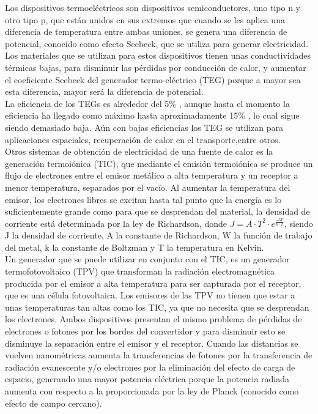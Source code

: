 Los dispositivos termoeléctricos son dispositivos semiconductores, uno tipo n y otro tipo p, que están unidos en sus extremos que cuando se les aplica una diferencia de temperatura entre ambas uniones, se genera una diferencia de potencial, conocido como efecto Seebeck, que se utiliza para generar electricidad. Los materiales que se utilizan para estos dispositivos tienen unas conductividades térmicas bajas, para disminuir las pérdidas por conducción de calor, y aumentar el coeficiente Seebeck del generador termo-eléctrico (TEG) porque a mayor sea esta diferencia, mayor será la diferencia de potencial.\\

La eficiencia de los TEGs es alrededor del 5\% \cite{TEG5efficiency}, aunque hasta el momento la eficiencia ha llegado como máximo hasta aproximadamente 15\% \cite{TEG15efficiency}, lo cual sigue siendo demasiado baja. Aún con bajas eficiencias los TEG se utilizan para aplicaciones espaciales, recuperación de calor en el transporte,entre otros.\\


Otros sistemas de obtención de electricidad de una fuente de calor es la generación termoiónica (TIC), que mediante el emisión termoiónica se produce un flujo de electrones entre el emisor metálico a alta temperatura y un receptor a menor temperatura, separados por el vacío. Al aumentar la temperatura del emisor, los electrones libres se excitan hasta tal punto que la energía es lo suficientemente grande como para que se desprendan del material, la densidad de corriente está determinada por la ley de Richardson, donde $J=A\cdot T^2\cdot e^{\frac{-W}{k\cdot T}}$, siendo J la densidad de corriente, A la constante de Richardson, W la función de trabajo del metal, k la constante de Boltzman y T la temperatura en Kelvin.\\

Un generador que se puede utilizar en conjunto con el TIC, es un generador termofotovoltaico (TPV) que transforman la radiación electromagnética producida por el emisor a alta temperatura para ser capturada por el receptor, que es una célula fotovoltaica. Los emisores de las TPV no tienen que estar a unas temperaturas tan altas como los TIC, ya que no necesita que se desprendan los electrones. Ambos dispositivos presentan el mismo problema de pérdidas de electrones o fotones por los bordes del convertidor y para disminuir esto se disminuye la separación entre el emisor y el receptor. Cuando las distancias se vuelven nanométricas aumenta la transferencias de fotones por la transferencia de radiación evanescente y/o electrones por la eliminación del efecto de carga de espacio, generando una mayor potencia eléctrica porque la potencia radiada aumenta con respecto a la proporcionada por la ley de Planck (conocido como efecto de campo cercano).\\

